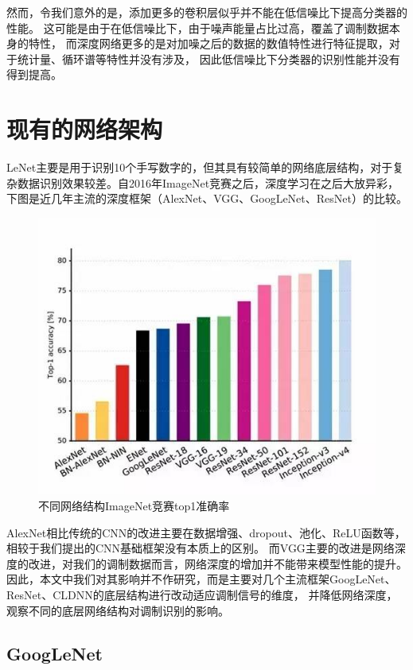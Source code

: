 然而，令我们意外的是，添加更多的卷积层似乎并不能在低信噪比下提高分类器的性能。
这可能是由于在低信噪比下，由于噪声能量占比过高，覆盖了调制数据本身的特性，
而深度网络更多的是对加噪之后的数据的数值特性进行特征提取，对于统计量、循环谱等特性并没有涉及，
因此低信噪比下分类器的识别性能并没有得到提高。\par

\section{现有的网络架构}
LeNet主要是用于识别10个手写数字的，但其具有较简单的网络底层结构，对于复杂数据识别效果较差。自2016年ImageNet竞赛之后，深度学习在之后大放异彩，下图是近几年主流的深度框架（AlexNet、VGG、GoogLeNet、ResNet）的比较。\par
\begin{figure}[!h]
	\centering
	\includegraphics[scale=0.5]{figures/chapter_5/fig_5_4}
	\caption{不同网络结构ImageNet竞赛top1准确率}\label{sec:fig_5_4}
\end{figure}
AlexNet相比传统的CNN的改进主要在数据增强、dropout、池化、ReLU函数等，相较于我们提出的CNN基础框架没有本质上的区别。
而VGG主要的改进是网络深度的改进，对我们的调制数据而言，网络深度的增加并不能带来模型性能的提升。
因此，本文中我们对其影响并不作研究，而是主要对几个主流框架GoogLeNet、ResNet、CLDNN的底层结构进行改动适应调制信号的维度，
并降低网络深度，观察不同的底层网络结构对调制识别的影响。

\subsection{GoogLeNet}

